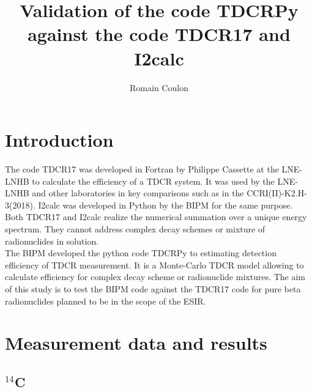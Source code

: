 \documentclass[12pt]{iopart}
\begin{document}
\title[Draft - May 2023]{Validation of the code TDCRPy against the code TDCR17 and I2calc}
\author{Romain Coulon}
\address{Bureau International des Poids et Mesures, Pavillon de Breteuil, F-92312 S\`{e}vres Cedex, France.}


\section{Introduction}

The code TDCR17 was developed in Fortran by Philippe Cassette at the LNE-LNHB to calculate the efficiency of a TDCR system. It was used by the LNE-LNHB and other laboratories in key comparisons such as in the CCRI(II)-K2.H-3(2018). I2calc was developed in Python by the BIPM for the same purpose. Both TDCR17 and I2calc realize the numerical summation over a unique energy spectrum. They cannot address complex decay schemes or mixture of radionuclides in solution.\\ 

The BIPM developed the python code TDCRPy to estimating detection efficiency of TDCR measurement. It is a Monte-Carlo TDCR model allowing to calculate efficiency for complex decay scheme or radionuclide mixtures. The aim of this study is to test the BIPM code against the TDCR17 code for pure beta radionuclides planned to be in the scope of the ESIR.\\

\tableofcontents

\pagebreak
\section{Measurement data and results}
\subsection{$^{14}$C}
\end{document}
